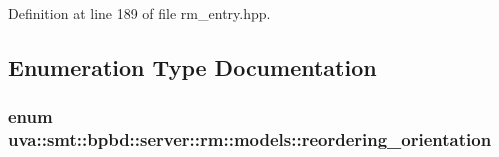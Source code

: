 Definition at line 189 of file rm\+\_\+entry.\+hpp.



\subsection{Enumeration Type Documentation}
\hypertarget{namespaceuva_1_1smt_1_1bpbd_1_1server_1_1rm_1_1models_ad5c3e828e24fc03450e32df9c511e1ef}{}
\subsubsection[{reordering\+\_\+orientation}]{\setlength{\rightskip}{0pt plus 5cm}enum {\bf uva\+::smt\+::bpbd\+::server\+::rm\+::models\+::reordering\+\_\+orientation}}\label{namespaceuva_1_1smt_1_1bpbd_1_1server_1_1rm_1_1models_ad5c3e828e24fc03450e32df9c511e1ef}
